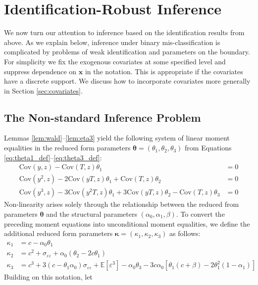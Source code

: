 \section{Identification-Robust Inference}
We now turn our attention to inference based on the identification results from above.
As we explain below, inference under binary mis-classification is complicated by problems of weak identification and parameters on the boundary.
For simplicity we fix the exogenous covariates at some specified level and suppress dependence on $\mathbf{x}$ in the notation.
This is appropriate if the covariates have a discrete support.
We discuss how to incorporate covariates more generally in Section \ref{sec:covariates}.

\subsection{The Non-standard Inference Problem}
Lemmas \ref{lem:wald}--\ref{lem:eta3} yield the following system of linear moment equalities in the reduced form parameters $\boldsymbol{\theta} = (\theta_1, \theta_2, \theta_3)$ from Equations \ref{eq:theta1_def}--\ref{eq:theta3_def}:
\begin{align*}
  \mbox{Cov}(y,z) - \mbox{Cov}(T,z) \theta_1 &= 0\\
  \mbox{Cov}(y^2,z) - 2\mbox{Cov}(yT,z) \theta_1 + \mbox{Cov}(T,z)\theta_2 &= 0\\
  \mbox{Cov}(y^3,z) - 3 \mbox{Cov}(y^2T,z) \theta_1 + 3\mbox{Cov}(yT,z) \theta_2 - \mbox{Cov}(T,z) \theta_3 &= 0
\end{align*}
Non-linearity arises solely through the relationship between the reduced from parameters $\boldsymbol{\theta}$ and the structural parameters $(\alpha_0, \alpha_1, \beta)$.
To convert the preceding moment equations into unconditional moment equalities, we define the additional reduced form parameters $\boldsymbol{\kappa} = (\kappa_1, \kappa_2, \kappa_3)$ as follows:
\begin{align*}
\kappa_1 &= c - \alpha_0 \theta_1\\
  \kappa_2 &= c^2 + \sigma_{\varepsilon\varepsilon} + \alpha_0 (\theta_2 - 2c \theta_1)\\
  \kappa_3 &= c^3 + 3\left( c - \theta_1 \alpha_0 \right) \sigma_{\varepsilon\varepsilon} + \mathbb{E}[\varepsilon^3] - \alpha_0 \theta_3 - 3 c \alpha_0 \left[ \theta_1 \left( c + \beta \right) - 2\theta_1^2 (1 - \alpha_1) \right]
\end{align*}
Building on this notation, let
